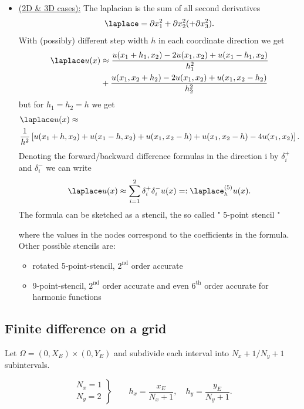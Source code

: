 \begin{itemize}
	\item \underline{(2D \& 3D cases):} 
		The laplacian is the sum of all second derivatives
		\[
			\laplace = \partial x_1^2 + \partial x_2^2 (+\partial x_3^2)
		.\] 
		With (possibly) different step width $h$ in each coordinate direction we get
		\begin{align*}
			\laplace u(x) &\approx \frac{u(x_1 + h_1, x_2) - 2u(x_1, x_2) + u(x_1 -h_1, x_2)}{h_1^2}\\
						  &+ \frac{u(x_1, x_2 + h_2) - 2u(x_1, x_2) + u(x_1, x_2 -h_2)}{h_2^2}
		\end{align*}
		but for $h_1 = h_2 = h$ we get
		\begin{align*}
			&\laplace u(x) \approx\\ 
			&\frac{1}{h^2}\left[u(x_1+ h, x_2) + u(x_1-h, x_2) + u(x_1, x_2 -h) + u(x_1, x_2 -h) -4u(x_1, x_2)\right].
		\end{align*}
		Denoting the forward/backward difference formulas
		in the direction i by $\delta_{i}^{+}$ and $\delta_{i}^{-}$ we can write
		\[
			\laplace u(x) \approx \sum_{i=1}^{2}{\delta_{i}^{+}\delta_{i}^{-}u(x)}=:\laplace_{h}^{(5)}u(x)
		.\] 
		The formula can be sketched as a stencil, the so called " 5-point stencil "
		
		where the values in the nodes correspond to the coefficients in the formula.
		Other possible stencils are:
		\begin{itemize}
			\item rotated 5-point-stencil, $2^{\text{nd}}$ order accurate
				
			\item 9-point-stencil,  $2^{\text{nd}}$ order accurate and even $6^{\text{th}}$ order accurate for harmonic functions
				
		\end{itemize}
\end{itemize}

\subsection{Finite difference on a grid}%
\label{sec:Finite difference on a grid}
Let $\Omega =(0, X_{E}) \times (0,Y_{E})$ and subdivide each interval into $N_{x}+1 / N_{y} + 1$ subintervals.

\[
\left.
	\begin{array}{c}
	N_{x} = 1 \\
	N_{y} = 2
\end{array}
\right\} \qquad
h_{x} = \frac{x_{E}}{N_{x}+1}, \quad h_{y}= \frac{y_{E}}{N_{y}+1}
.\] 


